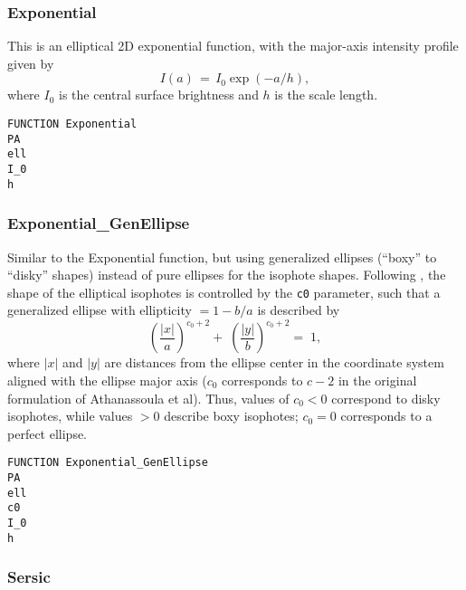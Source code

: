 \documentclass[10pt,a4paper,article]{memoir}
\begin{document}
\subsubsection{Exponential}

This is an elliptical 2D exponential function, with the major-axis intensity
profile given by
\begin{equation}
I(a) \, = \, I_{0} \exp(-a/h),
\end{equation}
where $I_{0}$ is the central surface brightness and $h$ is the scale length.

\begin{verbatim}
FUNCTION Exponential
PA
ell
I_0
h
\end{verbatim}


\subsubsection{Exponential\_GenEllipse}

Similar to the Exponential function, but using generalized ellipses (``boxy'' to
``disky'' shapes) instead of pure ellipses for the isophote shapes.  Following
\citet{athanassoula90}, the shape of the elliptical isophotes is controlled by
the \texttt{c0} parameter, such that a generalized ellipse with ellipticity $= 1
- b/a$ is described by
\begin{equation}
\left( \frac{|x|}{a} \right)^{c_{0} + 2} \! \! + \; \left( \frac{|y|}{b} \right)^{c_{0} + 2}  = \; 1,
\end{equation}
where $|x|$ and $|y|$ are distances from the ellipse center in the coordinate system
aligned with the ellipse major axis ($c_{0}$ corresponds to $c - 2$ in the original
formulation of Athanassoula et al).
Thus, values of $c_{0} < 0$ correspond to disky isophotes, while values $> 0$ describe boxy
isophotes; $c_{0} = 0$ corresponds to a perfect ellipse.

\begin{verbatim}
FUNCTION Exponential_GenEllipse
PA
ell
c0
I_0
h
\end{verbatim}


\subsubsection{Sersic}
\end{document}
